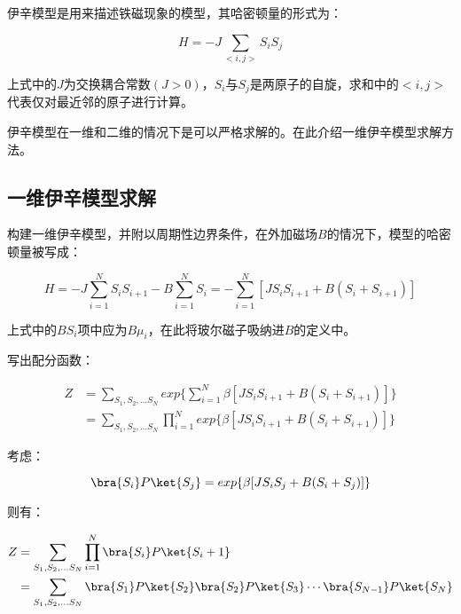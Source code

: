
\begin{issues}
\issueDraft
\issueMissDepend
{}
\end{issues}



伊辛模型是用来描述铁磁现象的模型，其哈密顿量的形式为：

\begin{equation}
H=-J\sum\limits_{<i,j>}S_iS_j
\end{equation}

上式中的$J$为交换耦合常数$(J>0)$，$S_i$与$S_j$是两原子的自旋，求和中的$<i,j>$代表仅对最近邻的原子进行计算。

伊辛模型在一维和二维的情况下是可以严格求解的。在此介绍一维伊辛模型求解方法。

\subsection{一维伊辛模型求解}

构建一维伊辛模型，并附以周期性边界条件，在外加磁场$B$的情况下，模型的哈密顿量被写成：

\begin{equation}
H=-J\sum\limits_{i=1}^NS_iS_{i+1}-B\sum\limits_{i=1}^NS_i=-\sum\limits_{i=1}^N[JS_iS_{i+1}+B(S_i+S_{i+1})]
\end{equation}

上式中的$BS_i$项中应为$B\mu_i$，在此将玻尔磁子吸纳进$B$的定义中。

写出配分函数：

\begin{align}
Z&=\sum\limits_{S_1,S_2,...S_N}exp\{\sum\limits_{i=1}^N\beta[JS_iS_{i+1}+B(S_i+S_{i+1})]\} \\
&=\sum\limits_{S_1,S_2,...S_N}\prod\limits_{i=1}^N exp\{\beta[JS_iS_{i+1}+B(S_i+S_{i+1})]\}
\end{align}

考虑：

\begin{equation}
\bra{S_i}P\ket{S_j}=exp\{\beta[JS_iS_{j}+B(S_i+S_{j})]\}
\end{equation}

则有：

\begin{align}
Z&=\sum\limits_{S_1,S_2,...S_N}\prod\limits_{i=1}^N\bra{S_i}P\ket{S_i+1} \\
&=\sum\limits_{S_1,S_2,...S_N}\bra{S_1}P\ket{S_2} \bra{S_2}P\ket{S_3}\cdots\bra{S_{N-1}}P\ket{S_N} 
\end{align}

